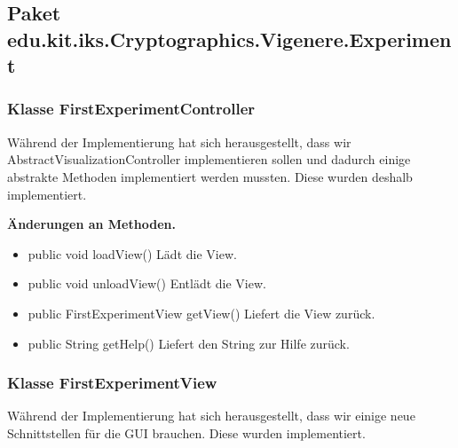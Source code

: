 \documentclass{article}
\begin{document}
  \subsection{Paket edu.kit.iks.Cryptographics.Vigenere.Experiment}
    \subsubsection{Klasse FirstExperimentController}
	Während der Implementierung hat sich herausgestellt, dass wir AbstractVisualizationController implementieren sollen und dadurch 
	einige abstrakte Methoden implementiert werden mussten. Diese wurden deshalb implementiert.\newline
           
    \textbf{Änderungen an Methoden.}
      \begin{itemize}
		\item public void loadView()\newline
              Lädt die View.
        \item public void unloadView()\newline
              Entlädt die View.
        \item public FirstExperimentView getView()\newline
              Liefert die View zurück.
        \item public String getHelp()\newline
              Liefert den String zur Hilfe zurück.
      \end{itemize}
	  
    \subsubsection{Klasse FirstExperimentView}
	Während der Implementierung hat sich herausgestellt, dass wir einige neue Schnittstellen für die GUI brauchen. Diese wurden implementiert.\newline
           
\end{document}
